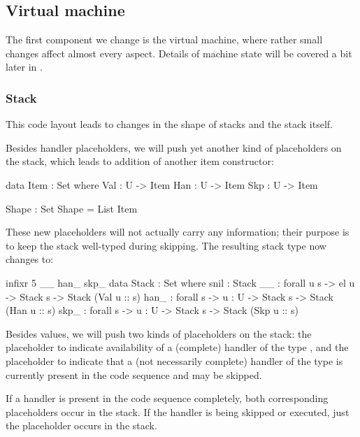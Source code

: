 
\subsection{Virtual machine}

The first component we change is the virtual machine, where rather small
changes affect almost every aspect. Details of machine state will be covered
a bit later in .

\subsubsection{Stack}

This code layout leads to changes in the shape of stacks and the stack itself.

Besides handler placeholders, we will push yet another kind of placeholders on
the stack, which leads to addition of another item constructor:
\\ \begin{minipage}{\textwidth}
\begin{code}
  data Item : Set where
    Val : U -> Item
    Han : U -> Item
    Skp : U -> Item
\end{code} \end{minipage}

\begin{code}
  Shape : Set
  Shape = List Item
\end{code}
\noindent These new placeholders will not actually carry any information; their
purpose is to keep the stack well-typed during skipping. The resulting stack type
now changes to:
\begin{code}
  infixr 5 _\scons\_ han\scons\_ skp\scons\_
  data Stack : Set where
    snil : Stack \NIL
    _\scons\_ : forall {u s} -> el u -> Stack s -> Stack (Val u :: s)
    han\scons\_ : forall {s} -> {u : U} -> Stack s -> Stack (Han u :: s)
    skp\scons\_ : forall {s} -> {u : U} -> Stack s -> Stack (Skp u :: s)
\end{code}
\noindent Besides values, we will push two kinds of placeholders on the stack:
the placeholder  to indicate availability of a (complete) handler
of the type , and the placeholder  to indicate that a
(not necessarily complete) handler of the type  is currently present
in the code sequence and may be skipped.

If a handler is present in the code sequence completely, both corresponding
placeholders occur in the stack. If the handler is being skipped or executed,
just the  placeholder occurs in the stack.

